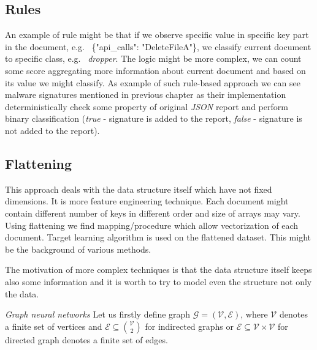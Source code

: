 \subsection{Rules}
An example of rule might be that if we observe specific value in specific key part in the document, e.g. \ \{"api_calls": "DeleteFileA"\}, we classify current document to specific class, e.g. \ \emph{dropper}. The logic might be more complex, we can count some score aggregating more information about current document and based on its value we might classify. As example of such rule-based approach we can see malware signatures mentioned in previous chapter as their implementation deterministically check some property of original \emph{JSON} report and perform binary classification (\emph{true} - signature is added to the report, \emph{false} - signature is not added to the report).

\subsection{Flattening}
This approach deals with the data structure itself which have not fixed dimensions. It is more feature engineering technique. Each document might contain different number of keys in different order and size of arrays may vary. Using flattening we find mapping/procedure which allow vectorization of each document. Target learning algorithm is used on the flattened dataset. This might be the background of various methods.

The motivation of more complex techniques is that the data structure itself keeps also some information and it is worth to try to model even the structure not only the data.

\emph{Graph neural networks}
Let us firstly define graph $\mathcal{G}=(\mathcal{V},\mathcal{E})$, where $\mathcal{V}$ denotes a finite set of vertices and $\mathcal{E}\subseteq\binom{\mathcal{V}}{2}$ for indirected graphs or $\mathcal{E}\subseteq\mathcal{V}\times\mathcal{V}$ for directed graph denotes a finite set of edges. 

